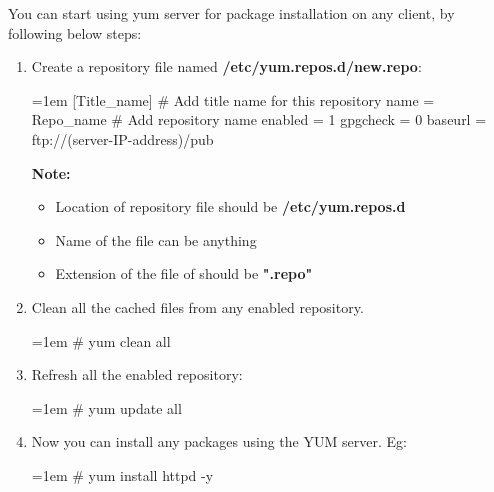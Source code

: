 \setlength{\columnsep}{3pt}
\begin{flushleft}
	\bigskip
	You can start using yum server for package installation on any client, by following below steps:
	
	\begin{enumerate}
		\item Create a repository file named \textbf{/etc/yum.repos.d/new.repo}:
		\begin{tcolorbox}[breakable,notitle,boxrule=-0pt,colback=black,colframe=black]
			\color{white}
			\font=1em
			[Title\_name] \color{yellow}  \# Add title name for this repository 
			\newline
			\color{white}
			name = Repo\_name
			\color{yellow}
			\# Add repository name
			\newline
			\color{white}
			enabled = 1
			\newline
			gpgcheck = 0
			\newline
			baseurl = ftp://(server-IP-address)/pub
			\font=4pt
		\end{tcolorbox}
		\bigskip
		\begin{tcolorbox}[breakable,notitle,boxrule=-0pt,colback=yellow,colframe=yellow]
			\color{black}
			\textbf{Note:} 
			\begin{itemize}
				\item Location of repository file should be \textbf{/etc/yum.repos.d}
				\item Name of the file can be anything
				\item Extension of the file of should be \textbf{".repo"}
			\end{itemize}
		\end{tcolorbox}

		
		
		\item Clean all the cached files from any enabled repository.
		\begin{tcolorbox}[breakable,notitle,boxrule=-0pt,colback=black,colframe=black]
			\color{green}
			\font=1em
			\# yum	clean	all
			\font=4pt
		\end{tcolorbox}
		
		
		\item Refresh all the enabled repository:
		\begin{tcolorbox}[breakable,notitle,boxrule=-0pt,colback=black,colframe=black]
			\color{green}
			\font=1em
			\# yum 	update 	all
			\font=4pt
		\end{tcolorbox}
		
		
		\item Now you can install any packages using the YUM server.
		\newline
		Eg:
		\begin{tcolorbox}[breakable,notitle,boxrule=-0pt,colback=black,colframe=black]
			\color{green}
			\font=1em
			\# yum	install	httpd -y		
			\font=4pt
		\end{tcolorbox}

		
	\end{enumerate}
	
	
	
\end{flushleft}
\newpage



